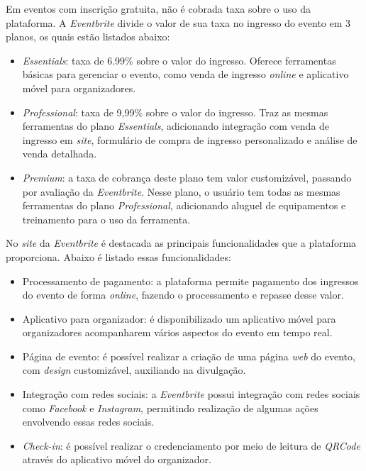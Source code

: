 Em eventos com inscrição gratuita, não é cobrada taxa sobre o uso da plataforma. A \textit{Eventbrite} divide o valor de sua taxa no ingresso do evento em 3 planos, os quais estão listados abaixo:

\begin{itemize}
    \item \textit{Essentials}: taxa de 6.99\% sobre o valor do ingresso. Oferece ferramentas básicas para gerenciar o evento, como venda de ingresso \textit{online} e aplicativo móvel para organizadores.
    \item \textit{Professional}: taxa de 9,99\% sobre o valor do ingresso. Traz as mesmas ferramentas do plano \textit{Essentials}, adicionando integração com venda de ingresso em \textit{site}, formulário de compra de ingresso personalizado e análise de venda detalhada.
    \item \textit{Premium}: a taxa de cobrança deste plano tem valor customizável, passando por avaliação da \textit{Eventbrite}. Nesse plano, o usuário tem todas as mesmas ferramentas do plano \textit{Professional}, adicionando aluguel de equipamentos e treinamento para o uso da ferramenta.
\end{itemize}

No \textit{site} da \textit{Eventbrite} é destacada as principais funcionalidades que a plataforma proporciona. Abaixo é listado essas funcionalidades:

\begin{itemize}
    \item Processamento de pagamento: a plataforma permite pagamento dos ingressos do evento de forma \textit{online}, fazendo o processamento e repasse desse valor.
    \item Aplicativo para organizador: é disponibilizado um aplicativo móvel para organizadores acompanharem vários aspectos do evento em tempo real.
    \item Página de evento: é possível realizar a criação de uma página \textit{web} do evento, com \textit{design} customizável, auxiliando na divulgação.
    \item Integração com redes sociais: a \textit{Eventbrite} possui integração com redes sociais como \textit{Facebook} e \textit{Instagram}, permitindo realização de algumas ações envolvendo essas redes sociais.
    \item \textit{Check-in}: é possível realizar o credenciamento por meio de leitura de \textit{QRCode} através do aplicativo móvel do organizador.
\end{itemize}

